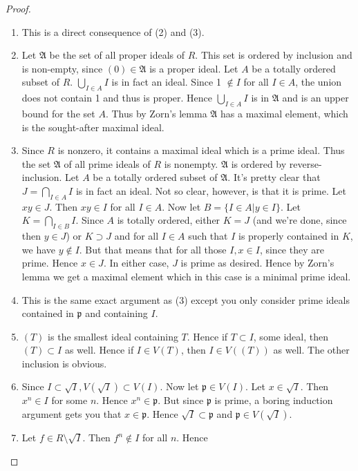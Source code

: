 \begin{proof}
\
\begin{enumerate}
\item This is a direct consequence of (2) and (3).
\item Let $\mathfrak{A}$ be the set of all proper ideals of $R$. This set is 
ordered by inclusion and is non-empty, since $(0) \in \mathfrak{A}$ is a proper 
ideal. Let $A$ be a totally ordered subset of $R$. $\bigcup_{I \in A} I$ is in 
fact an ideal. Since 1 $\notin I$ for all $I \in A$, the union does not contain 
1 and thus is proper. Hence $\bigcup_{I \in A} I$ is in $\mathfrak{A}$ and is 
an upper bound for the set $A$. Thus by Zorn's lemma $\mathfrak{A}$ has a 
maximal element, which is the sought-after maximal ideal.
\item Since $R$ is nonzero, it contains a maximal ideal which is a prime ideal. 
Thus the set $\mathfrak{A}$ of all prime ideals of $R$ is nonempty. 
$\mathfrak{A}$ is ordered by reverse-inclusion. Let $A$ be a totally ordered 
subset of $\mathfrak{A}$. It's pretty clear that $J = \bigcap_{I \in A} I$ is 
in fact an ideal. Not so clear, however, is that it is prime. Let $xy \in J$. 
Then $xy \in I$ for all $I \in A$. Now let $B = \{I \in A | y \in I\}$. Let $K 
= \bigcap_{I \in B} I$. Since $A$ is totally ordered, either $K = J$ (and we're 
done, since then $y \in J$) or $K \supset J$ and for all $I \in A$ such that 
$I$ is properly contained in $K$, we have $y \notin I$. But that means that for 
all those $I, x \in I$, since they are prime. Hence $x \in J$. In either case, 
$J$ is prime as desired. Hence by Zorn's lemma we get a maximal element which 
in this case is a minimal prime ideal.
\item This is the same exact argument as (3) except you only consider prime 
ideals contained in $\mathfrak{p}$ and containing $I$.
\item $(T)$ is the smallest ideal containing $T$. Hence if $T \subset I$, some 
ideal, then $(T) \subset I$ as well. Hence if $I \in V(T)$, then $I \in V((T))$ 
as well. The other inclusion is obvious.
\item Since $I \subset \sqrt{I}, V(\sqrt{I}) \subset V(I)$. Now let 
$\mathfrak{p} \in V(I)$. Let $x \in \sqrt{I}$. Then $x^n \in I$ for some $n$. 
Hence $x^n \in \mathfrak{p}$. But since $\mathfrak{p}$ is prime, a boring 
induction argument gets you that $x \in \mathfrak{p}$. Hence $\sqrt{I} \subset 
\mathfrak{p}$ and $\mathfrak{p} \in V(\sqrt{I})$.
\item Let $f \in R \setminus \sqrt{I}$. Then $f^n \notin I$ for all $n$. Hence 

\end{enumerate}
\end{proof}

